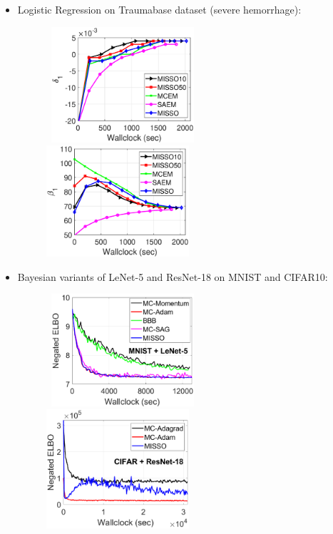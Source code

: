 \documentclass[a0,landscape]{a0poster}
\theoremstyle{definition}
\begin{document}
\begin{multicols}{3}
\begin{tcolorbox}[colback=white!5!white,colframe=red!75!black,fonttitle=\sffamily\bfseries\large,title=Numerical Experiments]
\begin{itemize}
\item Logistic Regression on Traumabase dataset (severe hemorrhage):
\begin{figure}[H]
\centering
    \mbox{
        \includegraphics[width=0.5\textwidth]{fig/logisticdelta.eps}
        \includegraphics[width=0.5\textwidth]{fig/logisticbeta.eps}
    }
\end{figure} 

\item Bayesian variants of LeNet-5 and ResNet-18 on MNIST and CIFAR10:
\begin{figure}[H]
\centering
    \mbox{
        \includegraphics[width=0.5\textwidth]{fig/mnist.eps}
        \includegraphics[width=0.5\textwidth]{fig/cifar.eps}
    }
\label{fig:gmmplots}
\end{figure} 
\end{itemize}
\end{tcolorbox}


\end{multicols}
\end{document}
